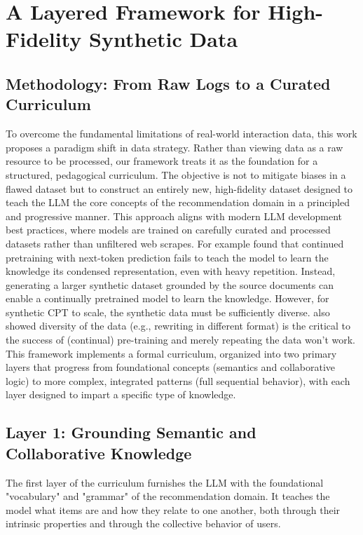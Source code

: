 \documentclass[]{fairmeta}
\begin{document}
\section{A Layered Framework for High-Fidelity Synthetic Data}\label{sec:data}
\subsection{Methodology: From Raw Logs to a Curated Curriculum}
To overcome the fundamental limitations of real-world interaction data, this work proposes a paradigm shift in data strategy. Rather than viewing data as a raw resource to be processed, our framework treats it as the foundation for a structured, pedagogical curriculum. The objective is not to mitigate biases in a flawed dataset but to construct an entirely new, high-fidelity dataset designed to teach the LLM the core concepts of the recommendation domain in a principled and progressive manner. This approach aligns with modern LLM development best practices, where models are trained on carefully curated and processed datasets rather than unfiltered web scrapes. For example \cite{yang2024syntheticcontinuedpretraining} found that continued pretraining with next-token prediction fails to teach the model to learn the knowledge its condensed representation, even with heavy repetition. Instead, generating a larger synthetic dataset grounded by the source documents can enable a continually pretrained model to learn the knowledge. However, for synthetic CPT to scale, the synthetic data must be sufficiently diverse. \cite{allenzhu2024physicslanguagemodels31} also showed diversity of the data (e.g., rewriting in different format) is the critical to the success of (continual) pre-training and merely repeating the data won't work. This framework implements a formal curriculum, organized into two primary layers that progress from foundational concepts (semantics and collaborative logic) to more complex, integrated patterns (full sequential behavior), with each layer designed to impart a specific type of knowledge.

\subsection{Layer 1: Grounding Semantic and Collaborative Knowledge}
The first layer of the curriculum furnishes the LLM with the foundational "vocabulary" and "grammar" of the recommendation domain. It teaches the model what items are and how they relate to one another, both through their intrinsic properties and through the collective behavior of users.
\end{document}

